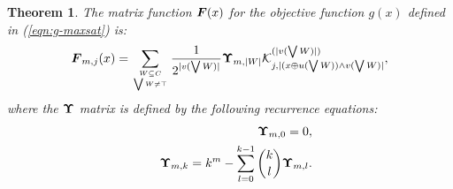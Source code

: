 \documentclass{article}
\newtheorem{theorem}{Theorem}
\def\vec#1{\mathchoice{\mbox{\boldmath$\displaystyle#1$}}
  {\mbox{\boldmath$\textstyle#1$}}
  {\mbox{\boldmath$\scriptstyle#1$}}
  {\mbox{\boldmath$\scriptscriptstyle#1$}}}
\newcommand{\comb}[2]{\binom{#1}{#2}}
\newcommand{\krawel}[3]{\mathcal{K}^{#1}_{#2,#3}}
\begin{document}
\begin{theorem}

The matrix function $\vec{F}(x)$ for the objective function $g(x)$ defined in (\ref{eqn:g-maxsat}) is:
\begin{equation}
\label{eqn:matrix-f-maxsat}
\vec{F}_{m,j}(x) = \sum_{W \subseteq C \atop \bigvee W \neq \top} \frac{1}{2^{|v(\bigvee W)|}} \vec{\Upsilon}_{m,|W|} \krawel{(|v(\bigvee W)|)}{j}{|(x \oplus u(\bigvee W))\wedge v (\bigvee W)|},
\end{equation}
where the $\vec{\Upsilon}$ matrix is defined by the following recurrence equations:
\begin{eqnarray}
\label{eqn:upsilon-base}
&& \vec{\Upsilon}_{m,0}=0, \\
\label{eqn:upsilon-rec}
&& \vec{\Upsilon}_{m,k} = k^m - \sum_{l=0}^{k-1} \comb{k}{l} \vec{\Upsilon}_{m,l}.
\end{eqnarray}
\end{theorem}
\end{document}
